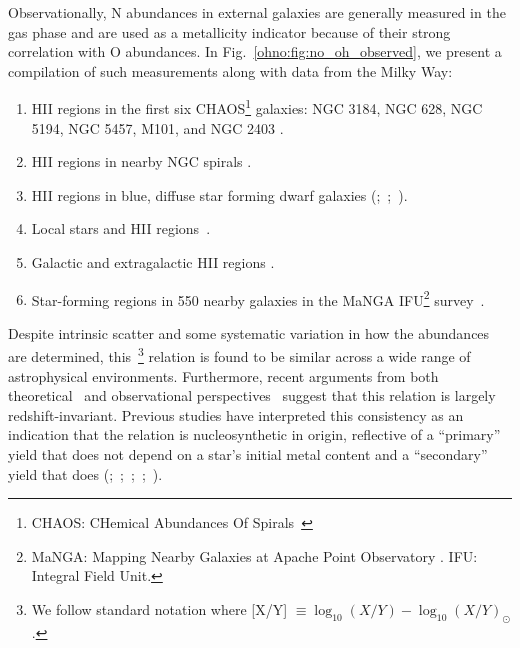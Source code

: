 Observationally, N abundances in external galaxies are generally measured in
the gas phase and are used as a metallicity indicator because of their strong
correlation with O abundances.
In Fig.~\ref{ohno:fig:no_oh_observed}, we present a compilation of such measurements
along with data from the Milky Way:
\begin{enumerate}
	\item[\textbf{1.}] HII regions in the first six CHAOS\footnote{
		CHAOS: CHemical Abundances Of Spirals~\citep{Berg2015}
	} galaxies: NGC 3184, NGC 628, NGC 5194, NGC 5457, M101, and NGC 2403
	\citep{Berg2020, Skillman2020, Rogers2021}.

	\item[\textbf{2.}] HII regions in nearby NGC spirals
	\citep*[][``ONS'' calibration]{Pilyugin2010}.

	\item[\textbf{3.}] HII regions in blue, diffuse star forming dwarf galaxies
	(\citealp{Berg2012};~\citealp*{Izotov2012};~\citealp{James2015}).

	\item[\textbf{4.}] Local stars and HII regions~\citep{Dopita2016}.

	\item[\textbf{5.}] Galactic and extragalactic HII regions
	\citep*{Henry2000}.

	\item[\textbf{6.}] Star-forming regions in 550 nearby galaxies in the
	MaNGA IFU\footnote{
		MaNGA: Mapping Nearby Galaxies at Apache Point Observatory
		\citep{Bundy2015}.
		IFU: Integral Field Unit.
	} survey~\citep{Belfiore2017}.
\end{enumerate}
Despite intrinsic scatter and some systematic variation in how the abundances
are determined, this~\ohno\footnote{
	We follow standard notation where [X/Y]
	$\equiv \log_{10}(X/Y) - \log_{10}(X/Y)_\odot$.
} relation is found to be similar across a wide range of astrophysical
environments.
Furthermore, recent arguments from both theoretical~\mbox{\citep{Vincenzo2018}}
and observational perspectives~\citep{HaydenPawson2022} suggest that this
relation is largely redshift-invariant.
Previous studies have interpreted this consistency as an indication that the
relation is nucleosynthetic in origin, reflective of a ``primary'' yield that
does not depend on a star's initial metal content and a ``secondary'' yield
that does (\citealp{VilaCostas1993};~\citealp*{vanZee1998};~\citealp{Henry1999,
PerezMontero2009};~\citealp*{Pilyugin2012};~\citealp{Andrews2013}).
